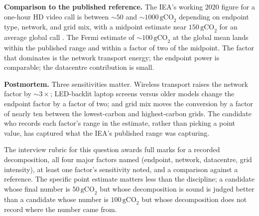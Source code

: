 \begin{estimation}
\textbf{Comparison to the published reference.} The IEA's
working $2020$ figure for a one-hour HD video call is between
$\sim 50$ and $\sim 1000 \,\text{gCO}_{2}$ depending on
endpoint type, network, and grid mix, with a midpoint estimate
near $150 \,\text{gCO}_{2}$ for an average global call
\cite{data:ch09t3b-iea-data-2020}. The Fermi estimate of
$\sim 100 \,\text{gCO}_{2}$ at the global mean lands within
the published range and within a factor of two of the
midpoint. The factor that dominates is the network transport
energy; the endpoint power is comparable; the datacentre
contribution is small.

\textbf{Postmortem.} Three sensitivities matter. Wireless
transport raises the network factor by $\sim 3 \times$; LED-backlit
laptop screens versus older models change the endpoint factor by
a factor of two; and grid mix moves the conversion by a factor
of nearly ten between the lowest-carbon and highest-carbon
grids. The candidate who records each factor's range in the
estimate, rather than picking a point value, has captured what
the IEA's published range was capturing.
\end{estimation}

The interview rubric for this question awards full marks for a
recorded decomposition, all four major factors named (endpoint,
network, datacentre, grid intensity), at least one factor's
sensitivity noted, and a comparison against a reference. The
specific point estimate matters less than the discipline; a
candidate whose final number is $50 \,\text{gCO}_{2}$ but
whose decomposition is sound is judged better than a candidate
whose number is $100 \,\text{gCO}_{2}$ but whose
decomposition does not record where the number came from.

